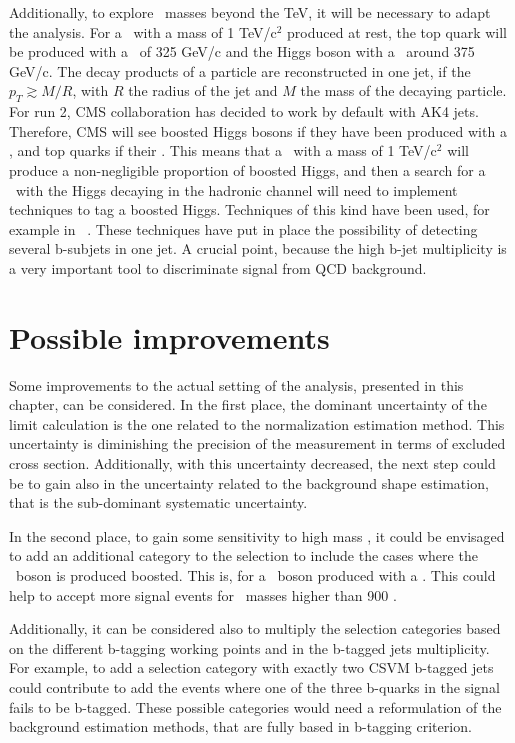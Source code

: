 Additionally, to explore \Tp~masses beyond the TeV, it will be necessary to adapt the analysis. For a \Tp~with a mass of 1 TeV/$\text{c}^{2}$ produced at rest, the top quark will be produced with a \pt~of 325 GeV/c and the Higgs boson with a \pt~around 375 GeV/c. The decay products of a particle are reconstructed in one jet, if the $p_{T}\gtrsim M/R$, with $R$ the radius of the jet and $M$ the mass of the decaying particle. For run 2, CMS collaboration has decided to work by default with AK4 jets. Therefore, CMS will see boosted Higgs bosons if they have been produced with a , and top quarks if their . This means that a \Tp~with a mass of 1 TeV/$\text{c}^{2}$ will produce a non-negligible proportion of boosted Higgs, and then a search for a \Tp~with the Higgs decaying in the hadronic channel will need to implement techniques to tag a boosted Higgs. Techniques of this kind have been used, for example in~ \cite{Khachatryan:2015axa}. These techniques have put in place the possibility of detecting several b-subjets in one jet. A crucial point, because the high b-jet multiplicity is a very important tool to discriminate signal from QCD background.

\section{Possible improvements}
\label{sec:impro}

Some improvements to the actual setting of the analysis, presented in this chapter, can be considered. In the first place, the dominant uncertainty of the limit calculation is the one related to the normalization estimation method. This uncertainty is diminishing the precision of the measurement in terms of excluded cross section. Additionally, with this uncertainty decreased, the next step could be to gain also in the uncertainty related to the background shape estimation, that is the sub-dominant systematic uncertainty.

In the second place, to gain some sensitivity to high mass \Tp, it could be envisaged to add an additional category to the selection to include the cases where the \W~boson is produced boosted. This is, for a \W~boson produced with a . This could help to accept more signal events for \Tp~masses higher than 900 \GeVcc.

Additionally, it can be considered also to multiply the selection categories based on the different b-tagging working points and in the b-tagged jets multiplicity. For example, to add a selection category with exactly two CSVM b-tagged jets could contribute to add the events where one of the three b-quarks in the signal fails to be b-tagged. These possible categories would need a reformulation of the background estimation methods, that are fully based in b-tagging criterion.

